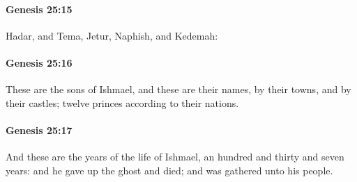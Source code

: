 		\paragraph{Genesis 25:15} %
			\label{GENESIS-25-15}

			Hadar, and Tema, Jetur, Naphish, and Kedemah:


		\paragraph{Genesis 25:16} %
			\label{GENESIS-25-16}

			These are the sons of Ishmael, and these are their names, by their towns, and by their castles; twelve princes according to their nations.


		\paragraph{Genesis 25:17} %
			\label{GENESIS-25-17}

			And these are the years of the life of Ishmael, an hundred and thirty and seven years: and he gave up the ghost and died; and was gathered unto his people.


